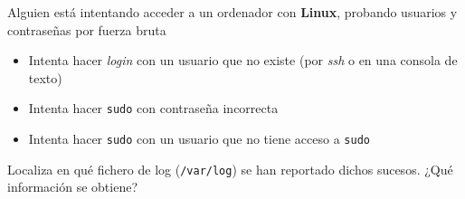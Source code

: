 \begin{homeworkProblem}

  \begin{multicols}{2}

    \begin{Actividad}
      Alguien está intentando acceder a un ordenador con \textbf{Linux}, probando usuarios y contraseñas por fuerza bruta
      \begin{itemize}
      \item Intenta hacer \textit{login} con un usuario que no existe (por \textit{ssh} o en una consola de texto)
      \item Intenta hacer \texttt{sudo} con contraseña incorrecta
      \item Intenta hacer \texttt{sudo} con un usuario que no tiene acceso a \texttt{sudo}
      \end{itemize}
    \end{Actividad}
    \columnbreak

    \null \vfill

    \begin{Actividad}
      Localiza en qué fichero de log (\texttt{/var/log}) se han reportado dichos sucesos. ¿Qué información se obtiene?
    \end{Actividad}

    \vfill \null

  \end{multicols}


\end{homeworkProblem}



